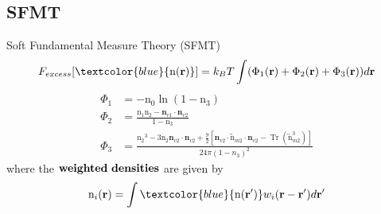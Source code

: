 \documentclass{beamer}
\renewcommand{\vec}[1]{\mathbf{#1}}
\begin{document}
    
  


\subsection{SFMT}
\begin{frame}{Soft Fundamental Measure Theory (SFMT)}
     \vspace{-0.5em}
  \begin{align}\label{eq:Fexfunctional}
        F_{excess}[\textcolor{blue}{\text{n}(\vec{r})}]=k_BT\int(\Phi_1(\vec{r})+\Phi_2(\vec{r})+\Phi_3(\vec{r}{)) d}\vec{r} \nonumber
     \end{align}
     \vspace{-1.5em}
     \small
     \begin{align}
         \Phi_1 &= -\text{n}_{0}\ln(1-\text{n}_{3}) \nonumber\\
         \Phi_2 &= \frac{\text{n}_{1}\text{n}_{2}-\vec{n}_{v1}\cdot\vec{n}_{v2}}{1-\text{n}_{3}} \nonumber\\
         \Phi_3 &= \frac{{\text{n}_2}^3-3\text{n}_2\vec{n}_{v2}\cdot\vec{n}_{v2}+\frac{9}{2}[\vec{n}_{v2}\cdot{\overleftrightarrow{\text{n}}_{m2}}\cdot{\vec{n}_{v2}}-\operatorname{Tr}({\overleftrightarrow{\text{n}}^3_{m2}})]}{24\pi(1-n_3)^2} \nonumber 
     \end{align} 
     \normalsize
     where the $\bold{weighted~densities}$ are given by
     \begin{align}
         \text{n}_i(\vec r)= \int \textcolor{blue}{\text{n}(\vec r')}w_i(\vec r-\vec r')d \vec r'  \nonumber
     \end{align}
\end{frame}
\end{document}
